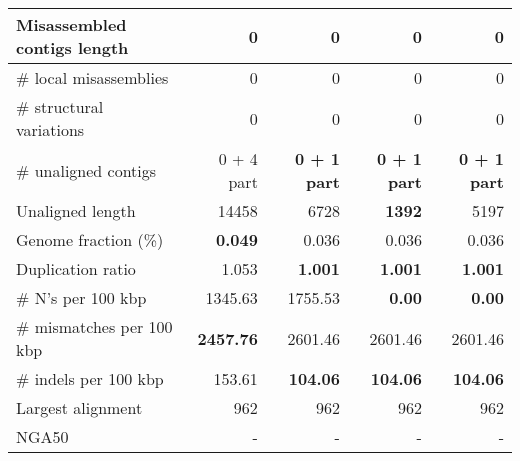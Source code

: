 \documentclass[12pt,a4paper]{article}
\begin{document}
\begin{table}[ht]
\begin{center}
\begin{tabular}{|l*{4}{|r}|}
Misassembled contigs length & 0 & 0 & 0 & 0 \\ \hline
\# local misassemblies & 0 & 0 & 0 & 0 \\ \hline
\# structural variations & 0 & 0 & 0 & 0 \\ \hline
\# unaligned contigs & 0 + 4 part & {\bf 0 + 1 part} & {\bf 0 + 1 part} & {\bf 0 + 1 part} \\ \hline
Unaligned length & 14458 & 6728 & {\bf 1392} & 5197 \\ \hline
Genome fraction (\%) & {\bf 0.049} & 0.036 & 0.036 & 0.036 \\ \hline
Duplication ratio & 1.053 & {\bf 1.001} & {\bf 1.001} & {\bf 1.001} \\ \hline
\# N's per 100 kbp & 1345.63 & 1755.53 & {\bf 0.00} & {\bf 0.00} \\ \hline
\# mismatches per 100 kbp & {\bf 2457.76} & 2601.46 & 2601.46 & 2601.46 \\ \hline
\# indels per 100 kbp & 153.61 & {\bf 104.06} & {\bf 104.06} & {\bf 104.06} \\ \hline
Largest alignment & 962 & 962 & 962 & 962 \\ \hline
NGA50 & - & - & - & - \\ \hline
\end{tabular}
\end{center}
\end{table}
\end{document}
